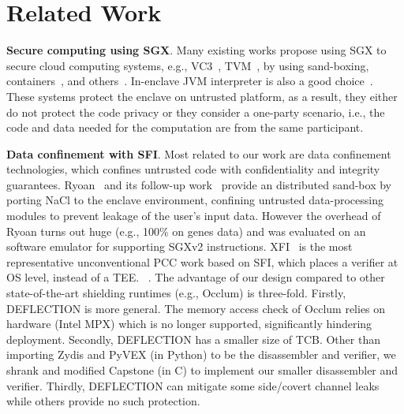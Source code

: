 \section{Related Work}\label{sec-relatedwork}

\vspace{3pt}\noindent\textbf{Secure computing using SGX}.
Many existing works propose using SGX to secure cloud computing systems, e.g., VC3~\cite{schuster2015vc3}, TVM~\cite{hynes2018efficient}, by using 
sand-boxing, containers~\cite{tian2019practical}, and others~\cite{shinde2017panoply,shanker2020evaluation}. 
In-enclave JVM interpreter is also a good choice~\cite{jiang2020uranus}. These systems protect the enclave on untrusted platform, as a result, they either do not protect the code privacy or they consider a one-party scenario, i.e., the code and data needed for the computation are from the same participant. 

\vspace{3pt}\noindent\textbf{Data confinement with SFI}.
Most related to our work are data confinement technologies, which confines untrusted code with confidentiality and integrity guarantees. Ryoan~\cite{hunt2018ryoan} and its follow-up work~\cite{hunt2018chiron} provide an distributed sand-box by porting NaCl to the enclave environment, confining untrusted data-processing modules to prevent leakage of the user’s input data. However the overhead of Ryoan turns out huge (e.g., 100\% on genes data) and was evaluated on an software emulator for supporting SGXv2 instructions.
XFI~\cite{erlingsson2006xfi} is the most representative unconventional PCC work based on SFI, which places a verifier at OS level, instead of a TEE. ~\cite{zhou2014armlock,tan2017principles}. The advantage of our design compared to other state-of-the-art shielding runtimes (e.g., Occlum) is three-fold. Firstly, DEFLECTION is more general. The memory access check of Occlum relies on hardware (Intel MPX) which is no longer supported, significantly hindering deployment. Secondly, DEFLECTION has a smaller size of TCB. Other than importing Zydis and PyVEX (in Python) to be the disassembler and verifier, we shrank and modified Capstone (in C) to implement our smaller disassembler and verifier. Thirdly, DEFLECTION can mitigate some side/covert channel leaks while others provide no such protection.

